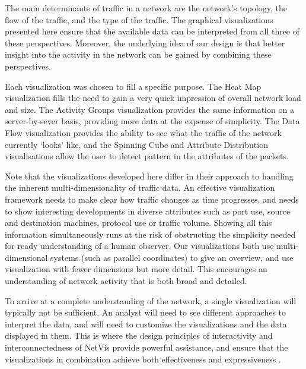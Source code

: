 The main determinants of traffic in a network are the network's topology, the flow of the traffic, and the type of the traffic. The graphical visualizations presented here ensure that the available data can be interpreted from all three of these perspectives. Moreover, the underlying idea of our design is that better insight into the activity in the network can be gained by combining these perspectives.

Each visualization was chosen to fill a specific purpose.  The Heat Map visualization fills the need to gain a very quick impression of overall network load and size.  The Activity Groups visualization provides the same information on a server-by-sever basis, providing more data at the expense of simplicity.  The Data Flow visualization provides the ability to see what the traffic of the network currently `looks' like, and the Spinning Cube and Attribute Distribution visualisations allow the user to detect pattern in the attributes of the packets.

Note that the visualizations developed here differ in their approach to handling the inherent multi-dimensionality of traffic data. An effective visualization framework needs to make clear how traffic changes as time progresses, and needs to show interesting developments in diverse attributes such as port use, source and destination machines, protocol use or traffic volume. Showing all this information simultaneously runs at the risk of obstructing the simplicity needed for ready understanding of a human observer. Our visualizations both use multi-dimensional systems (such as parallel coordinates) to give an overview, and use visualization with fewer dimensions but more detail. This encourages an understanding of network activity that is both broad and detailed.

To arrive at a complete understanding of the network, a single visualization will typically not be sufficient. An analyst will need to see different approaches to interpret the data, and will need to customize the visualizations and the data displayed in them. This is where the design principles of interactivity and interconnectedness of NetVis provide powerful assistance, and ensure that the visualizations in combination achieve both effectiveness and expressiveness \cite{mackinlay1987automatic}. 